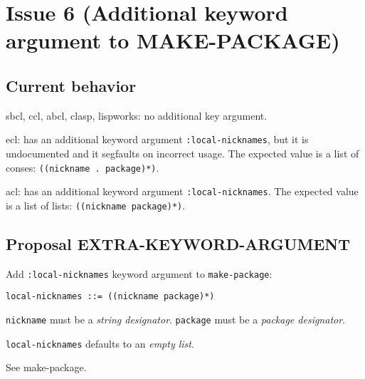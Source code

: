\documentclass[11pt]{article}
\author{Grolter Bell}
\date{\today}
\title{}
\begin{document}
\section{Issue 6 (Additional keyword argument to MAKE-PACKAGE)}
\label{sec:org6eda31c}
\subsection{Current behavior}
\label{sec:org4be7461}
sbcl, ccl, abcl, clasp, lispworks: no additional key argument.

ecl: has an additional keyword argument \texttt{:local-nicknames}, but it is undocumented
and it segfaults on incorrect usage. The expected value is a list of conses:
\texttt{((nickname . package)*)}.

acl: has an additional keyword argument \texttt{:local-nicknames}. The expected value is
a list of lists: \texttt{((nickname package)*)}.
\subsection{Proposal EXTRA-KEYWORD-ARGUMENT}
\label{sec:org828c272}
Add \texttt{:local-nicknames} keyword argument to \texttt{make-package}:
\begin{verbatim}
local-nicknames ::= ((nickname package)*)
\end{verbatim}

\texttt{nickname} must be a \emph{string designator}.
\texttt{package} must be a \emph{package designator}.

\texttt{local-nicknames} defaults to an \emph{empty list}.

See make-package.
\end{document}
